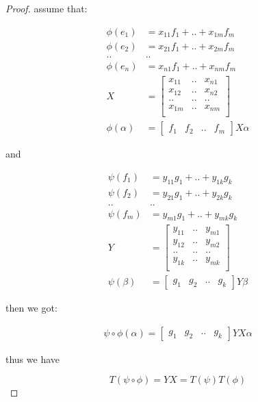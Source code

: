 \begin{proof}
    assume that:
    
    \begin{align*}
        \phi(e_1) &= x_{11}f_1 + .. + x_{1m}f_m \\
        \phi(e_2) &= x_{21}f_1 + .. + x_{2m}f_m \\
        .. & .. \\
        \phi(e_n) &= x_{n1}f_1 + .. + x_{nm}f_m \\
        X &= \begin{bmatrix}
            x_{11} & .. & x_{n1} \\
            x_{12} & .. & x_{n2} \\
            .. & .. & ..  \\
            x_{1m} & .. & x_{nm} \\
        \end{bmatrix} \\
        \phi(\alpha) &= \begin{bmatrix}
            f_1 & f_2 & .. & f_m
        \end{bmatrix} X \alpha
    \end{align*}

    and


    \begin{align*}
        \psi(f_1) &= y_{11}g_1 + .. + y_{1k}g_k \\
        \psi(f_2) &= y_{21}g_1 + .. + y_{2k}g_k \\
        .. & .. \\
        \psi(f_m) &= y_{m1}g_1 + .. + y_{mk}g_k \\
        Y &= \begin{bmatrix}
            y_{11} & .. & y_{m1} \\
            y_{12} & .. & y_{m2} \\
            .. & .. & ..  \\
            y_{1k} & .. & y_{mk} \\
        \end{bmatrix} \\
        \psi(\beta) &= \begin{bmatrix}
            g_1 & g_2 & .. & g_k
        \end{bmatrix} Y \beta
    \end{align*}

    then we got:

    \begin{align*}
        \psi \circ \phi(\alpha) = \begin{bmatrix}
            g_1 & g_2 & .. & g_k
        \end{bmatrix} Y X \alpha
    \end{align*}

    thus we have

    \[
        T(\psi \circ \phi) = YX = T(\psi) T(\phi)
    \]

\end{proof}

